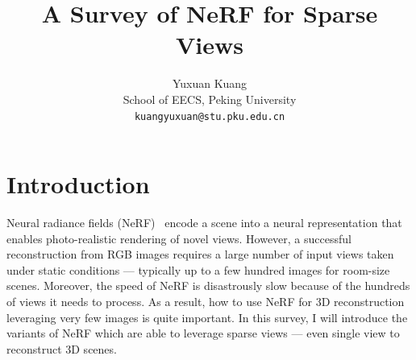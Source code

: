 \documentclass[10pt,twocolumn,letterpaper]{article}
\begin{document}
\title{A Survey of NeRF for Sparse Views}

\author{Yuxuan Kuang\\
School of EECS, Peking University\\
{\tt\small kuangyuxuan@stu.pku.edu.cn}
}

\maketitle



\section{Introduction}

Neural radiance fields (NeRF)~\cite{mildenhall2020nerf} encode a scene into a neural representation that enables photo-realistic rendering of novel views. However, a successful reconstruction from RGB images requires a large number of input views taken under static conditions — typically up to a few hundred images for room-size scenes.
Moreover, the speed of NeRF is disastrously slow because of the hundreds of views it needs to process.
As a result, how to use NeRF for 3D reconstruction leveraging very few images is quite important.
In this survey, I will introduce the variants of NeRF which are able to leverage sparse views — even single view to reconstruct 3D scenes.
\end{document}
